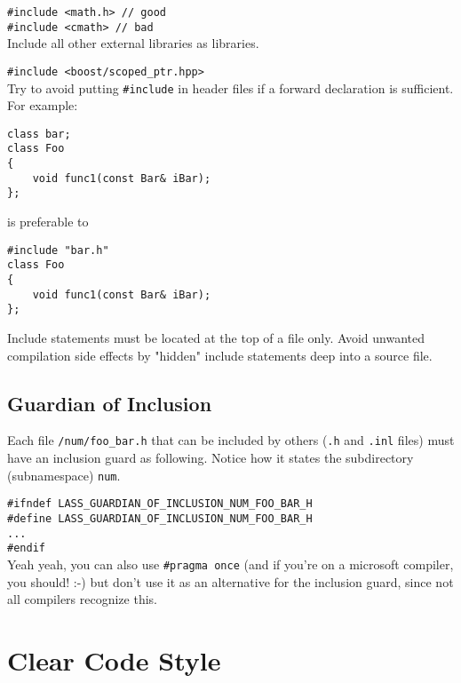 \documentclass[10pt,a4paper,titlepage,dutch]{report}
\begin{document}
\verb|#include <math.h> // good|\\
\verb|#include <cmath> // bad|\\

Include all other external libraries as libraries.

\verb|#include <boost/scoped_ptr.hpp>|\\

Try to avoid putting \verb|#include| in header files if a forward
declaration is sufficient.  For example:

\begin{verbatim}
class bar;
class Foo
{
    void func1(const Bar& iBar);
};
\end{verbatim}

is preferable to

\begin{verbatim}
#include "bar.h"
class Foo
{
    void func1(const Bar& iBar);
};
\end{verbatim}

Include statements must be located at the top of a file only.
Avoid unwanted compilation side effects by "hidden" include
statements deep into a source file.

\section {Guardian of Inclusion}

Each file \verb|/num/foo_bar.h| that can be included by others
(\verb|.h| and \verb|.inl| files) must have an inclusion guard as
following. Notice how it states the subdirectory (subnamespace)
\verb|num|.

\verb|#ifndef LASS_GUARDIAN_OF_INCLUSION_NUM_FOO_BAR_H|\\
\verb|#define LASS_GUARDIAN_OF_INCLUSION_NUM_FOO_BAR_H|\\
\verb|...|\\
\verb|#endif|\\

Yeah yeah, you can also use \verb|#pragma once| (and if you're on
a microsoft compiler, you should! :-) but don't use it as an
alternative for the inclusion guard, since not all compilers
recognize this.


\chapter{Clear Code Style}
\end{document}
